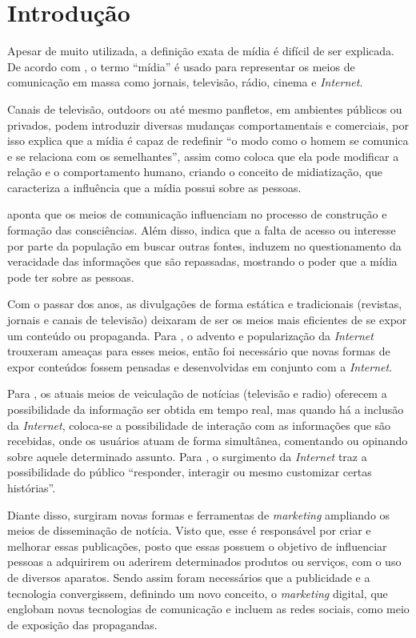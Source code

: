 \chapter[Introdução]{Introdução}
Apesar de muito utilizada, a definição exata de mídia é difícil de ser explicada. De acordo com \citet[p.51]{guazina2007}, o termo ``mídia'' é usado para representar os meios de comunicação em massa como jornais, televisão, rádio, cinema e \textit{Internet}.

Canais de televisão, outdoors ou até mesmo panfletos, em ambientes públicos ou privados, podem introduzir diversas mudanças comportamentais e comerciais, por isso \citet[p.3]{escobar2007} explica que a mídia é capaz de redefinir ``o modo como o homem se comunica e se relaciona com os semelhantes'', assim como \citet[p.54]{hjarvard2012} coloca que ela pode modificar a relação e o comportamento humano, criando o conceito de midiatização, que caracteriza a influência que a mídia possui sobre as pessoas.

\citet[p.53]{guazina2007} aponta que os meios de comunicação influenciam no processo de construção e formação das consciências. Além disso, \citet{silva2007} indica que a falta de acesso ou interesse por parte da população em buscar outras fontes, induzem no questionamento da veracidade das informações que são repassadas, mostrando o poder que a mídia pode ter sobre as pessoas.

Com o passar dos anos, as divulgações de forma estática e tradicionais (revistas, jornais e canais de televisão) deixaram de ser os meios mais eficientes de se expor um conteúdo ou propaganda. Para \citet{meditsch2001}, o advento e popularização da \textit{Internet} trouxeram ameaças para esses meios, então foi necessário que novas formas de expor conteúdos fossem pensadas e desenvolvidas em conjunto com a \textit{Internet}.


Para \citet[p.4]{escobar2007}, os atuais meios de veiculação de notícias (televisão e radio) oferecem a possibilidade da informação ser obtida em tempo real, mas quando há a inclusão da \textit{Internet}, coloca-se a possibilidade de interação com as informações que são recebidas, onde os usuários atuam de forma simultânea, comentando ou opinando sobre aquele determinado assunto. Para \citet{deuze2002}, o surgimento da \textit{Internet} traz a possibilidade do público ``responder, interagir ou mesmo customizar certas histórias''. 

Diante disso, surgiram novas formas e ferramentas de \textit{marketing} ampliando os meios de disseminação de notícia. Visto que, esse é responsável por criar e melhorar essas publicações, posto que essas possuem o objetivo de influenciar pessoas a adquirirem ou aderirem determinados produtos ou serviços, com o uso de diversos aparatos. Sendo assim foram necessários que a publicidade e a tecnologia convergissem, definindo um novo conceito, o \textit{marketing} digital, que englobam novas tecnologias de comunicação e incluem as redes sociais, como meio de exposição das propagandas.

